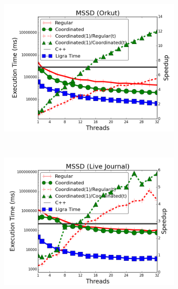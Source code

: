 \begin{figure}[]
\begin{subfigure}[b]{\plotsize\textwidth}
                \label{fig:coordination:coord_sssp_uspowergrid}
        \end{subfigure}\\
        \begin{subfigure}[b]{\plotsize\textwidth}
                \includegraphics[width=\textwidth]{experiments/coordination/cmp-shortest-orkut.png}
                \label{fig:coordination:coord_sssp_orkut}
        \end{subfigure}
        ~
        \begin{subfigure}[b]{\plotsize\textwidth}
                \includegraphics[width=\textwidth]{experiments/coordination/cmp-shortest-livejournal.png}
                \label{fig:coordination:coord_sssp_livejournal}
        \end{subfigure}\\


\end{figure}
